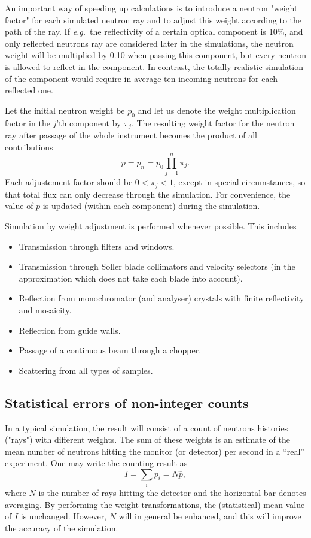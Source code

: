 An important way of speeding up calculations is to introduce
a neutron "weight factor" for each simulated neutron ray and to
adjust this weight according to the path of the ray.
If {\em e.g.}\ the reflectivity of a certain
optical component is 10\%, and only reflected neutrons ray are
considered later in the simulations, the neutron
weight will be multiplied by 0.10 when passing this component,
but every neutron is allowed to reflect in the component.
In contrast, the totally realistic simulation of the component
would require in average ten incoming neutrons for each reflected one.

Let the initial neutron weight be $p_0$ and let us denote the weight
multiplication factor in the $j$'th component by $\pi_j$.  The resulting
weight factor for the neutron ray after passage of the whole instrument
becomes the product of all contributions
\begin{equation}
\label{e:probprod}
p = p_n = p_0 \prod_{j=1}^n \pi_j .
\end{equation}
Each adjustement factor should be $0 < \pi_j < 1$, except in special circumstances, so that total flux can only decrease through the simulation. For convenience, the value of $p$ is updated (within each component)
during the simulation.

Simulation by weight adjustment is performed
whenever possible. This includes
\begin{itemize}
\item Transmission through filters and windows.
\item Transmission through Soller blade collimators and velocity
  selectors
 (in the approximation
 which does not take each blade into account).
\item Reflection from monochromator (and analyser) crystals
 with finite reflectivity and mosaicity.
\item Reflection from guide walls.
\item Passage of a continuous beam through a chopper.
\item Scattering from all types of samples.
\end{itemize}

\subsection{Statistical errors of non-integer counts}
\label{s:staterror}

In a typical simulation, the result will consist of a
count of neutrons histories ("rays") with different weights. The
sum of these weights is an estimate of the mean number of neutrons
hitting the monitor (or detector) per second in a ``real'' experiment.
One may write the counting result as
\begin{equation}
\label{psum}
I = \sum_i p_i = N \overline{p} ,
\end{equation}
where $N$ is the number of rays hitting the detector and the horizontal bar
denotes averaging.
By performing the weight transformations, the (statistical)
mean value of $I$ is unchanged. However, $N$ will in general be enhanced,
and this will improve the accuracy of the simulation.

